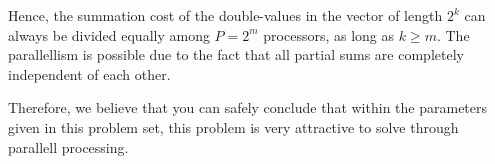 \documentclass[fontsize=11pt,paper=a4,titlepage]{report}
\begin{document}
Hence, the summation cost of the double-values in the vector of length $2^k$ can
always be divided equally among $P = 2^m$ processors, as long as $k\geq m$. The
parallellism is possible due to the fact that all partial sums are completely
independent of each other. \newline


Therefore, we believe that you can safely conclude that within the parameters
given in this problem set, this problem is very attractive to solve through
parallell processing.



% 
% 
% 
% 

\end{document}
